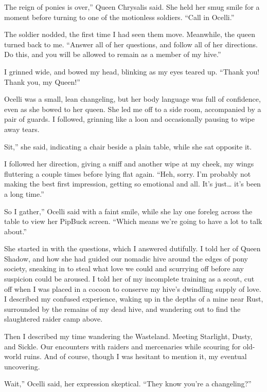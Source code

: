 \leavevmode{}The reign of ponies is over,” Queen Chrysalis said. She held her smug smile for a moment before turning to one of the motionless soldiers. “Call in Ocelli.”

The soldier nodded, the first time I had seen them move. Meanwhile, the queen turned back to me. “Answer all of her questions, and follow all of her directions. Do this, and you will be allowed to remain as a member of my hive.”

I grinned wide, and bowed my head, blinking as my eyes teared up. “Thank you! Thank you, my Queen!”

Ocelli was a small, lean changeling, but her body language was full of confidence, even as she bowed to her queen. She led me off to a side room, accompanied by a pair of guards. I followed, grinning like a loon and occasionally pausing to wipe away tears.

\leavevmode{}Sit,” she said, indicating a chair beside a plain table, while she sat opposite it.

I followed her direction, giving a sniff and another wipe at my cheek, my wings fluttering a couple times before lying flat again. “Heh, sorry. I’m probably not making the best first impression, getting so emotional and all. It’s just… it’s been a long time.”

\leavevmode{}So I gather,” Ocelli said with a faint smile, while she lay one foreleg across the table to view her PipBuck screen. “Which means we’re going to have a lot to talk about.”

She started in with the questions, which I answered dutifully. I told her of Queen Shadow, and how she had guided our nomadic hive around the edges of pony society, sneaking in to steal what love we could and scurrying off before any suspicion could be aroused. I told her of my incomplete training as a scout, cut off when I was placed in a cocoon to conserve my hive’s dwindling supply of love. I described my confused experience, waking up in the depths of a mine near Rust, surrounded by the remains of my dead hive, and wandering out to find the slaughtered raider camp above.

Then I described my time wandering the Wasteland. Meeting Starlight, Dusty, and Sickle. Our encounters with raiders and mercenaries while scouring for old-world ruins. And of course, though I was hesitant to mention it, my eventual uncovering.

\leavevmode{}Wait,” Ocelli said, her expression skeptical. “They know you’re a changeling?”

